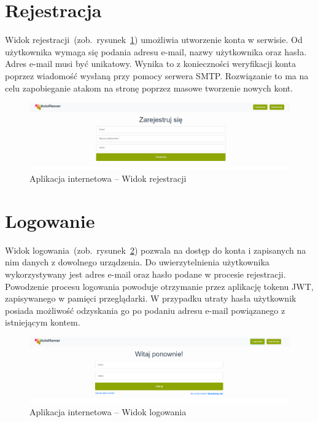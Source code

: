 \section{Rejestracja}
Widok rejestracji~(zob.~rysunek~\ref{rys:register}) umożliwia utworzenie konta w serwisie. Od użytkownika wymaga się podania adresu e-mail, nazwy użytkownika oraz hasła. Adres e-mail musi być unikatowy. Wynika to z konieczności weryfikacji konta poprzez wiadomość wysłaną przy pomocy serwera SMTP. Rozwiązanie to ma na celu zapobieganie atakom na stronę poprzez masowe tworzenie nowych kont. 
\begin{figure}[!ht]
\centering\includegraphics[width=\textwidth]{figures/register}
\caption{Aplikacja internetowa -- Widok rejestracji}\label{rys:register}
\end{figure}
\section{Logowanie}
Widok logowania~(zob.~rysunek~\ref{rys:login}) pozwala na dostęp do konta i zapisanych na nim danych z dowolnego urządzenia. Do uwierzytelnienia użytkownika wykorzystywany jest adres e-mail oraz hasło podane w procesie rejestracji. Powodzenie procesu logowania powoduje otrzymanie przez aplikację tokenu JWT, zapisywanego w pamięci przeglądarki. W przypadku utraty hasła użytkownik posiada możliwość odzyskania go po podaniu adresu e-mail powiązanego z istniejącym kontem.
\begin{figure}[h]
\centering\includegraphics[width=\textwidth]{figures/login}
\caption{Aplikacja internetowa -- Widok logowania}\label{rys:login}
\end{figure}
